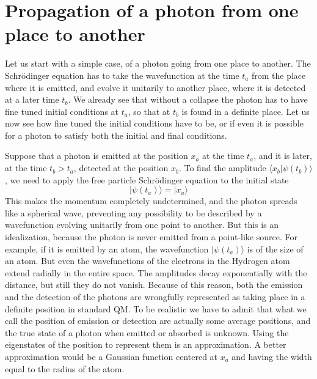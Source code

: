 \documentclass[12pt]{amsart}
\theoremstyle{definition}
\theoremstyle{plain}
\begin{document}
\section{Propagation of a photon from one place to another}
\label{s:particle_place2place}

Let us start with a simple case, of a photon going from one place to another. The Schr\"odinger equation has to take the wavefunction at the time $t_a$ from the place where it is emitted, and evolve it unitarily to another place, where it is detected at a later time $t_b$. We already see that without a collapse the photon has to have fine tuned initial conditions at $t_a$, so that at $t_b$ is found in a definite place. Let us now see how fine tuned the initial conditions have to be, or if even it is possible for a photon to satisfy both the initial and final conditions.
 
Suppose that a photon is emitted at the position $x_a$ at the time $t_a$, and it is later, at the time $t_b>t_a$, detected at the position $x_b$.
To find the amplitude $\langle{x_b}|{\psi(t_b)}\rangle$, we need to apply the free particle Schr\"odinger equation to the initial state
\begin{equation}
|{\psi(t_a)}\rangle = |{x_a}\rangle
\end{equation}
This makes the momentum completely undetermined, and the photon spreads like a spherical wave, preventing any possibility to be described by a wavefunction evolving unitarily from one point to another. But this is an idealization, because the photon is never emitted from a point-like source. For example, if it is emitted by an atom, the wavefunction $|{\psi(t_a)}\rangle$ is of the size of an atom. But even the wavefunctions of the electrons in the Hydrogen atom extend radially in the entire space. The amplitudes decay exponentially with the distance, but still they do not vanish.
Because of this reason, both the emission and the detection of the photons are wrongfully represented as taking place in a definite position in standard QM. To be realistic we have to admit that what we call the position of emission or detection are actually some average positions, and the true state of a photon when emitted or absorbed is unknown. Using the eigenstates of the position to represent them is an approximation. A better approximation would be a Gaussian function centered at $x_a$ and having the width equal to the radius of the atom.
\end{document}
